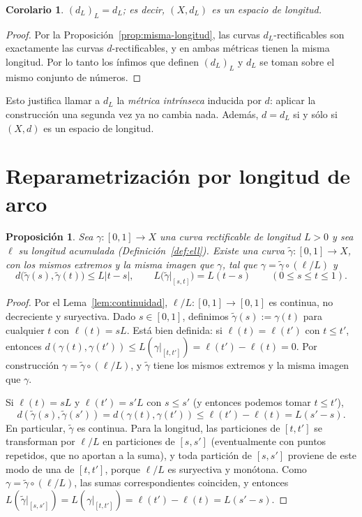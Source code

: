 \documentclass[12pt, a4paper]{amsart}
\newtheorem{proposicion}[teorema]{Proposición}
\newtheorem{corolario}[teorema]{Corolario}
\theoremstyle{definition}
\theoremstyle{remark}
\begin{document}
\begin{corolario}
$(d_L)_L=d_L$; es decir, $(X,d_L)$ es un espacio de longitud.
\end{corolario}

\begin{proof}
Por la Proposición~\ref{prop:misma-longitud}, las curvas $d_L$-rectificables son exactamente las curvas $d$-rectificables, y en ambas métricas tienen la misma longitud. Por lo tanto los ínfimos que definen $(d_L)_L$ y $d_L$ se toman sobre el mismo conjunto de números.
\end{proof}

Esto justifica llamar a $d_L$ la \emph{métrica intrínseca} inducida por $d$: aplicar la construcción una segunda vez ya no cambia nada. Además, $d=d_L$ si y sólo si $(X,d)$ es un espacio de longitud.

\section{Reparametrización por longitud de arco}

\begin{proposicion}\label{prop:reparam}
Sea $\gamma\colon[0,1]\to X$ una curva rectificable de longitud $L>0$ y sea $\ell$ su longitud acumulada (Definición~\ref{def:ell}). Existe una curva $\tilde\gamma\colon[0,1]\to X$, con los mismos extremos y la misma imagen que $\gamma$, tal que $\gamma=\tilde\gamma\circ(\ell/L)$ y
\[
d\big(\tilde\gamma(s),\tilde\gamma(t)\big)\le L|t-s|,\qquad L\big(\tilde\gamma|_{[s,t]}\big)=L(t-s)\qquad(0\le s\le t\le1).
\]
\end{proposicion}

\begin{proof}
Por el Lema~\ref{lem:continuidad}, $\ell/L\colon[0,1]\to[0,1]$ es continua, no decreciente y suryectiva. Dado $s\in[0,1]$, definimos $\tilde\gamma(s):=\gamma(t)$ para cualquier $t$ con $\ell(t)=sL$. Está bien definida: si $\ell(t)=\ell(t')$ con $t\le t'$, entonces $d(\gamma(t),\gamma(t'))\le L(\gamma|_{[t,t']})=\ell(t')-\ell(t)=0$. Por construcción $\gamma=\tilde\gamma\circ(\ell/L)$, y $\tilde\gamma$ tiene los mismos extremos y la misma imagen que $\gamma$.

Si $\ell(t)=sL$ y $\ell(t')=s'L$ con $s\le s'$ (y entonces podemos tomar $t\le t'$),
\[
d(\tilde\gamma(s),\tilde\gamma(s'))=d(\gamma(t),\gamma(t'))\le\ell(t')-\ell(t)=L(s'-s).
\]
En particular, $\tilde\gamma$ es continua. Para la longitud, las particiones de $[t,t']$ se transforman por $\ell/L$ en particiones de $[s,s']$ (eventualmente con puntos repetidos, que no aportan a la suma), y toda partición de $[s,s']$ proviene de este modo de una de $[t,t']$, porque $\ell/L$ es suryectiva y monótona. Como $\gamma=\tilde\gamma\circ(\ell/L)$, las sumas correspondientes coinciden, y entonces $L(\tilde\gamma|_{[s,s']})=L(\gamma|_{[t,t']})=\ell(t')-\ell(t)=L(s'-s)$.
\end{proof}
\end{document}
